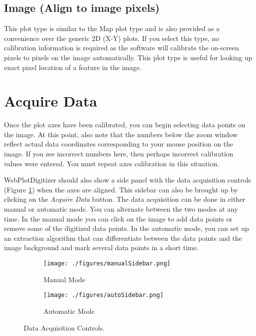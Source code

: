 \documentclass[letterpaper, 10pt]{article}
\begin{document}
\subsection{Image (Align to image pixels)}
This plot type is similar to the Map plot type and is also provided as a convenience over the generic 2D (X-Y) plots. If you select this type, no calibration information is required as the software will calibrate the on-screen pixels to pixels on the image automatically. This plot type is useful for looking up exact pixel location of a feature in the image.


\section{Acquire Data}

Once the plot axes have been calibrated, you can begin selecting data points on the image. At this point, also note that the numbers below the zoom window reflect actual data coordinates corresponding to your mouse position on the image. If you see incorrect numbers here, then perhaps incorrect calibration values were entered. You must repeat axes calibration in this situation. 

WebPlotDigitizer should also show a side panel with the data acquisition controls (Figure \ref{fig:acquireData}) when the axes are aligned. This sidebar can also be brought up by clicking on the \emph{Acquire Data} button. The data acquisition can be done in either manual or automatic mode. You can alternate between the two modes at any time. In the manual mode you can click on the image to add data points or remove some of the digitized data points. In the automatic mode, you can set up an extraction algorithm that can differentiate between the data points and the image background and mark several data points in a short time.

\begin{figure}
\centering
{
\begin{subfigure}{0.3\textwidth}
\texttt{[image: ./figures/manualSidebar.png]}
\caption{Manual Mode}
\end{subfigure}
\begin{subfigure}{0.3\textwidth}
\texttt{[image: ./figures/autoSidebar.png]}
\caption{Automatic Mode}
\end{subfigure}
}
\caption{Data Acquisition Controls.}
\label{fig:acquireData}
\end{figure}
\end{document}
